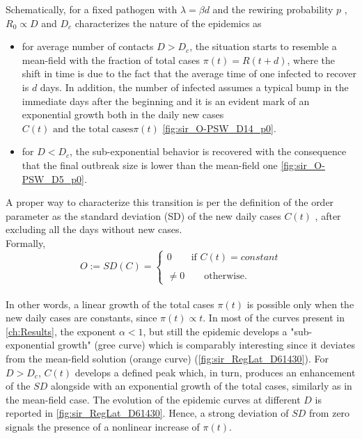 \documentclass[a4paper,10pt,twoside]{book} %
\theoremstyle{definition}
\begin{document}
Schematically, for a fixed pathogen with $\lambda = \beta d$ and the rewiring probability $p$ , $R_0 \propto D$ and $D_c$ characterizes the nature of the epidemics as \cite{Thurner::NetBasedExpl}
\begin{itemize}
	\item for average number of contacts $D>D_c$, the situation starts to resemble a mean-field with the fraction of total cases $\pi(t) = R(t+d)$, where the shift in time is due to the fact that the average time of one infected to recover is $d$ days. In addition, the number of infected assumes a typical bump in the immediate days after the beginning and it is an evident mark of an exponential growth both in the daily new cases $C(t) \text{ and the total cases} \pi(t)$ \autoref{fig:sir_O-PSW_D14_p0}.
	\item for $D<D_c$, the sub-exponential behavior is recovered with the consequence that the final outbreak size is lower than the mean-field one \autoref{fig:sir_O-PSW_D5_p0}.
\end{itemize}
A proper way to characterize this transition is per the definition of the order parameter \cite{Thurner::NetBasedExpl} as the standard deviation (SD) of the new daily cases $ C(t)$ , after excluding all the days without new cases.
\\Formally,
\begin{equation}
	O := SD(C) = 
	\begin{cases}
		0 \qquad \text{if $C(t) = constant$}\\\\
		\neq 0 \qquad \text{otherwise.} 
	\end{cases}
	\label{eq:def_OrdP}
\end{equation}
\\In other words, a linear growth of the total cases $ \pi(t)$ is possible only when the new daily cases are constants, since $\pi(t) \propto t$. In most of the curves present in \autoref{ch:Results}, the exponent $ \alpha < 1$, but still the epidemic develops a "sub-exponential growth" (gree curve) which is comparably interesting since it deviates from the mean-field solution (orange curve) (\autoref{fig:sir_RegLat_D61430}).  
For $D > D_c$, $C(t)$ develops a defined peak which, in turn, produces an enhancement of the $SD$ alongside with an exponential growth of the total cases, similarly as in the mean-field case. The evolution of the epidemic curves at different $D$ is reported in \autoref{fig:sir_RegLat_D61430}. Hence, a strong deviation of $SD$ from zero signals the presence of a nonlinear increase of $\pi(t)$.
\end{document}
